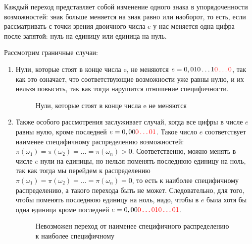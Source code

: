 \documentclass[a4paper, 14pt]{extarticle}
\begin{document}
Каждый переход представляет собой изменение одного знака в упорядоченности возможностей: знак больше меняется на знак равно или наоборот, то есть, если рассматривать с точки зрения двоичного числа $e$ у нас меняется одна цифра после запятой: нуль на единицу или единица на нуль.

Рассмотрим граничные случаи:
\begin{enumerate} 
    \item Нули, которые стоят в конце числа e, не меняются $e=0,010\ldots1{\color{red}0\ldots0}$, так как это означает, что соответствующие возможности уже равны нулю, и их нельзя повысить, так как тогда нарушится отношение специфичности.
    \begin{figure}[h!]
    \caption{Нули, которые стоят в конце числа e не меняются}
    \end{figure}
    \item Также особого рассмотрения заслуживает случай, когда все цифры в числе $e$  равны нулю, кроме последней $e=0,00{\color{red}0\ldots01}$. Такое число $e$ соответствует наименее специфичному распределению возможностей: $\pi(\omega_1)=\pi(\omega_2)=\ldots=\pi(\omega_n)>0$. Соответственно, можно менять в числе $e$ нули на единицы, но нельзя поменять последнюю единицу на ноль, так как тогда мы перейдем к распределению $\pi(\omega_1)=\pi(\omega_2)=\ldots=\pi(\omega_n)=0$, то есть к наиболее специфичному распределению, а такого перехода быть не может. Следовательно, для того, чтобы поменять последнюю единицу на ноль, надо, чтобы в $e$ была хотя бы одна единица кроме последней $e=0,00{\color{red}0\ldots010\ldots01}$.
    \begin{figure}[h!]
    \caption{Невозможен переход от наименее специфичного распределению к наиболее специфичному}
    \end{figure}
\end{enumerate}
\end{document}
